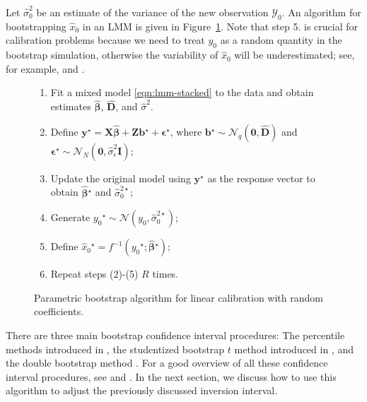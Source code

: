\documentclass{article}\usepackage[]{graphicx}\usepackage[]{color}
\newcommand{\boot}{\ensuremath{^\star}}
\begin{document}
Let $\widehat{\sigma}_0^2$ be an estimate of the variance of the new observation $\mathcal{Y}_0$.  An algorithm for bootstrapping $\widehat{x}_0$ in an LMM is given in Figure~\ref{fig:parboot}.  Note that step 5. is crucial for calibration problems because we need to treat $y_0$ as a random quantity in the bootstrap simulation, otherwise the variability of $\widehat{x}_0$ will be underestimated; see, for example, \citet{jones-bootstrapping-1999} and \citet{greenwell-investr-2014}.
\begin{figure}[!htb]
\begin{enumerate}
  \item Fit a mixed model \eqref{eqn:lmm-stacked} to the data and obtain estimates $\widehat{\bm{\beta}}$, $\widehat{\bm{D}}$, and $\widehat{\sigma}^2$.
	\item Define $\bm{y}\boot = \bm{X}\widehat{\bm{\beta}} + \bm{Z}\bm{b}\boot + \bm{\epsilon}\boot$, where $\bm{b}\boot \sim \mathcal{N}_q\left(\bm{0}, \widehat{\bm{D}}\right)$ and $\bm{\epsilon}\boot \sim \mathcal{N}_N\left(\bm{0}, \widehat{\sigma}_\epsilon^2\bm{I}\right)$;
	\item Update the original model using $\bm{y}\boot$ as the response vector to obtain $\widehat{\bm{\beta}}\boot$ and $\widehat{\sigma}_0^{2\star}$;
	\item Generate $y_0\boot \sim \mathcal{N}\left(y_0, \widehat{\sigma}_0^{2\star}\right)$;
	\item Define $\widehat{x}_0\boot = f^{-1}\left(y_0\boot; \widehat{\bm{\beta}}\boot\right)$;
  \item Repeat steps (2)-(5) $R$ times.
\end{enumerate}
\caption{Parametric bootstrap algorithm for linear calibration with random coefficients. \label{fig:parboot}}
\end{figure}

There are three main bootstrap confidence interval procedures: The percentile methods introduced in \citet{efron-bootstrap-1979}, the studentized bootstrap $t$ method introduced in \citet{efron-jackknife-1982}, and the double bootstrap method \citep{hall-bootstrap-1986}. For a good overview of all these confidence interval procedures, see \citet[chap. 5]{hinkley-bootstrap-1997} and \citet[chap. 11]{boos-essential-2013}. In the next section, we discuss how to use this algorithm to adjust the previously discussed inversion interval.
\end{document}
